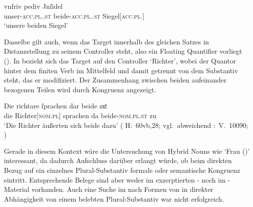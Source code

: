 \begin{exe}
\ex \label{ex:gendassgmt1_txt}
	\gll vnſriv pediv Jnſidel \\
		unser-\textsc{acc.pl.\NeutI.st} beide-\textsc{acc.pl.\NeutI.st}
			Siegel[\textsc{acc.pl.\NeutI}] \\
	\trans `unsere beiden Siegel'
		\parencites(Nr.~3224~A, Freising, 1299)[400,12--13]{cao4}
\end{exe}


Dasselbe gilt auch, wenn das Target innerhalb des gleichen Satzes in
Distanzstellung zu seinem Controller steht, also ein Floating Quantifier
vorliegt (). In  bezieht sich das
Target  auf den Controller  `Richter', wobei der
Quantor hinter dem finiten Verb im Mittelfeld und damit getrennt von dem
Substantiv steht, das er modifiziert. Der Zusammenhang zwischen beiden
aufeinander bezogenen Teilen wird durch Kongruenz angezeigt.

\begin{exe}
\ex \label{ex:gendassgmt2}
	\gll Die richtare ſprachen dar beide zuͦ. \\
		die Richter[\textsc{nom.pl\subM}] sprachen da
		beide-\textsc{nom.pl\subM.st} zu \\
	\trans `Die Richter äußerten sich beide dazu'
		(%
			H:~60vb,28; vgl.~abweichend
			\KC:~V.~10090;
			\cite[267]{schroeder1895}%
		)
\end{exe}

Gerade in diesem Kontext wäre die Untersuchung von Hybrid Nouns wie 
`Frau (\NeutF)' interessant, da dadurch Aufschluss darüber erlangt würde, ob
beim direkten Bezug auf ein einzelnes Plural-Substantiv formale oder
semantische Kongruenz eintritt. Entsprechende Belege sind aber weder im
exzerptierten \CAO{}- noch im \KC{}-Material vorhanden. Auch eine Suche im
\REM{} nach Formen von  in direkter Abhängigkeit von einem
belebten Plural-Substantiv war nicht erfolgreich.

